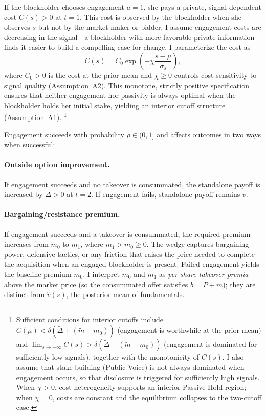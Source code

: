 If the blockholder chooses engagement $a = 1$, she pays a private, signal-dependent cost $C(s) > 0$ at $t = 1$. This cost is observed by the blockholder when she observes $s$ but not by the market maker or bidder. I assume engagement costs are decreasing in the signal---a blockholder with more favorable private information finds it easier to build a compelling case for change. I parameterize the cost as
\[
C(s) = C_0 \exp\!\left(-\chi \frac{s - \mu}{\sigma_s}\right),
\]
where $C_0 > 0$ is the cost at the prior mean and $\chi \geq 0$ controls cost sensitivity to signal quality (Assumption~A2). This monotone, strictly positive specification ensures that neither engagement nor passivity is always optimal when the blockholder holds her initial stake, yielding an interior cutoff structure (Assumption~A1).%
\footnote{Sufficient conditions for interior cutoffs include $C(\mu) < \delta(\tilde{\Delta} + (\tilde{m}-m_0))$ (engagement is worthwhile at the prior mean) and $\lim_{s\to-\infty} C(s) > \delta(\tilde{\Delta} + (\tilde{m}-m_0))$ (engagement is dominated for sufficiently low signals), together with the monotonicity of $C(s)$. I also assume that stake-building (Public Voice) is not always dominated when engagement occurs, so that disclosure is triggered for sufficiently high signals. When $\chi > 0$, cost heterogeneity supports an interior Passive Hold region; when $\chi = 0$, costs are constant and the equilibrium collapses to the two-cutoff case.}

Engagement succeeds with probability $\rho \in (0,1]$ and affects outcomes in two ways when successful:

\paragraph{Outside option improvement.} If engagement succeeds and no takeover is consummated, the standalone payoff is increased by $\Delta > 0$ at $t=2$. If engagement fails, standalone payoff remains $v$.

\paragraph{Bargaining/resistance premium.} If engagement succeeds and a takeover is consummated, the required premium increases from $m_0$ to $m_1$, where $m_1 > m_0 \geq 0$. The wedge captures bargaining power, defensive tactics, or any friction that raises the price needed to complete the acquisition when an engaged blockholder is present. Failed engagement yields the baseline premium $m_0$.
I interpret $m_0$ and $m_1$ as \emph{per-share takeover premia} above the market price (so the consummated offer satisfies $b=P+m$); they are distinct from $\hat{v}(s)$, the posterior mean of fundamentals.

